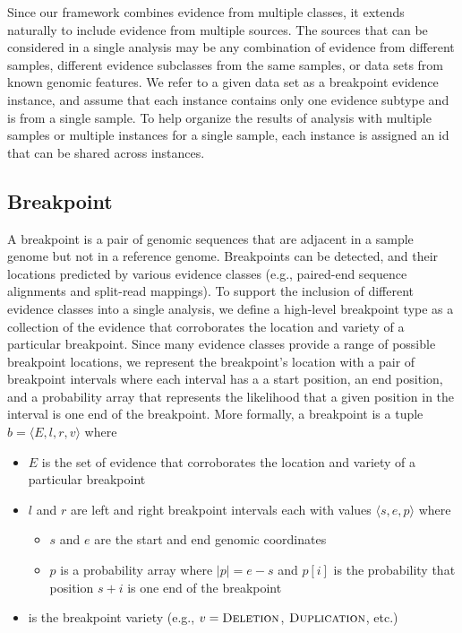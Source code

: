 \documentclass[11pt]{article}
\begin{document}
Since our framework combines evidence from multiple classes, it extends
naturally to include evidence from multiple sources.  The sources that can be
considered in a single analysis may be any combination of evidence from
different samples, different evidence subclasses from the same samples, or
data sets from known genomic features.  We refer to a given data set as a
breakpoint evidence instance, and assume that each instance contains only one
evidence subtype and is from a single sample.  To help organize the results of
analysis with multiple samples or multiple instances for a single sample,
each instance is assigned an id that can be shared across instances.


\subsection{Breakpoint}

A breakpoint is a pair of genomic sequences that are adjacent in a sample genome
but not in a reference genome. Breakpoints can be detected, and their locations
predicted by various evidence classes (e.g., paired-end sequence alignments and
split-read mappings).  To support the inclusion of different evidence classes
into a single analysis, we define a high-level breakpoint type as a collection
of the evidence that corroborates the location and variety of a particular
breakpoint.  Since many evidence classes provide a range of possible breakpoint
locations, we represent the breakpoint's location with a pair of breakpoint
intervals where each interval has a a start position, an end position, and a
probability array that represents the likelihood that a given position in the
interval is one end of the breakpoint.  More formally, a breakpoint is a tuple 
$b=\langle E,l,r,v \rangle$ where
\begin{itemize}
\item $E$ is the set of evidence that corroborates the location and variety of a
particular breakpoint
\item $l$ and $r$ are left and right breakpoint intervals each with values
	$\langle s, e, p \rangle$ where
	\begin{itemize}
		\item $s$ and $e$ are the start and end genomic coordinates
		\item $p$ is a probability array where $|p|=e-s$ and $p[i]$ is the
		probability that position $s+i$ is one end of the breakpoint
	\end{itemize}
\item  is the breakpoint variety (e.g., $v=\textsc{Deletion}$,
$\textsc{Duplication}$, etc.)
\end{itemize}
\end{document}

